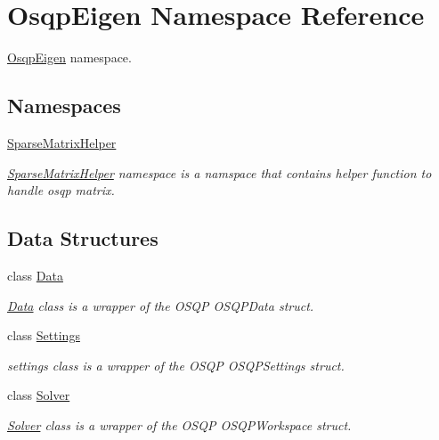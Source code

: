 \section{Osqp\+Eigen Namespace Reference}
\label{namespaceOsqpEigen}


\mbox{\hyperlink{namespaceOsqpEigen}{Osqp\+Eigen}} namespace.  


\subsection*{Namespaces}
\begin{DoxyCompactItemize}
\item 
 \mbox{\hyperlink{namespaceOsqpEigen_1_1SparseMatrixHelper}{Sparse\+Matrix\+Helper}}
\begin{DoxyCompactList}\small\item\em \mbox{\hyperlink{namespaceOsqpEigen_1_1SparseMatrixHelper}{Sparse\+Matrix\+Helper}} namespace is a namspace that contains helper function to handle osqp matrix. \end{DoxyCompactList}\end{DoxyCompactItemize}
\subsection*{Data Structures}
\begin{DoxyCompactItemize}
\item 
class \mbox{\hyperlink{classOsqpEigen_1_1Data}{Data}}
\begin{DoxyCompactList}\small\item\em \mbox{\hyperlink{classOsqpEigen_1_1Data}{Data}} class is a wrapper of the O\+S\+QP O\+S\+Q\+P\+Data struct. \end{DoxyCompactList}\item 
class \mbox{\hyperlink{classOsqpEigen_1_1Settings}{Settings}}
\begin{DoxyCompactList}\small\item\em settings class is a wrapper of the O\+S\+QP O\+S\+Q\+P\+Settings struct. \end{DoxyCompactList}\item 
class \mbox{\hyperlink{classOsqpEigen_1_1Solver}{Solver}}
\begin{DoxyCompactList}\small\item\em \mbox{\hyperlink{classOsqpEigen_1_1Solver}{Solver}} class is a wrapper of the O\+S\+QP O\+S\+Q\+P\+Workspace struct. \end{DoxyCompactList}\end{DoxyCompactItemize}
